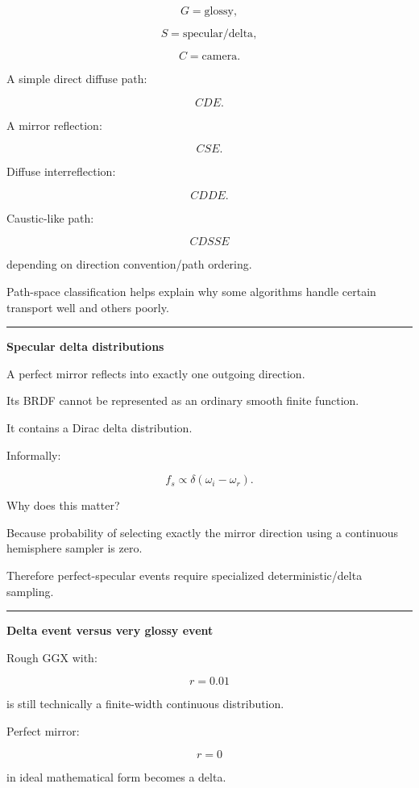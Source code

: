 \[
G=\text{glossy},
\]

\[
S=\text{specular/delta},
\]

\[
C=\text{camera}.
\]

A simple direct diffuse path:

\[
CDE.
\]

A mirror reflection:

\[
CSE.
\]

Diffuse interreflection:

\[
CDDE.
\]

Caustic-like path:

\[
CDSSE
\]

depending on direction convention/path ordering.

Path-space classification helps explain why some algorithms handle certain transport well and others poorly.

\begin{center}\rule{0.5\linewidth}{0.5pt}\end{center}

\textbf{Specular delta distributions}

A perfect mirror reflects into exactly one outgoing direction.

Its BRDF cannot be represented as an ordinary smooth finite function.

It contains a Dirac delta distribution.

Informally:

\[
f_s
\propto
\delta(
\omega_i-\omega_r
).
\]

Why does this matter?

Because probability of selecting exactly the mirror direction using a continuous hemisphere sampler is zero.

Therefore perfect-specular events require specialized deterministic/delta sampling.

\begin{center}\rule{0.5\linewidth}{0.5pt}\end{center}

\textbf{Delta event versus very glossy event}

Rough GGX with:

\[
r=0.01
\]

is still technically a finite-width continuous distribution.

Perfect mirror:

\[
r=0
\]

in ideal mathematical form becomes a delta.

